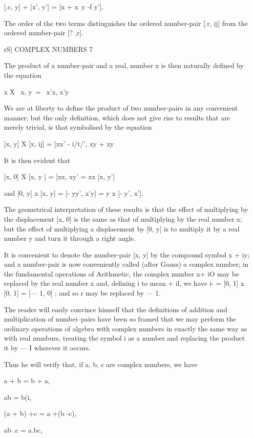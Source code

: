 [.c, y] + [x', y'] = [x + x\ y -f y']. 

The order of the two terms distiuguishes the ordered number-pair [.r, ij] from the ordered 
number-pair [?  ,r]. 



rS] COMPLEX NUMBERS 7 

The product of a number-pair and a real, number x is then naturally 
defined by the equation 

x X \ x, y\ = \ x'x, x'y\ 

We are at liberty to define the product of two number-pairs in any 
convenient manner; but the only definition, which does not give rise to 
results that are merely trivial, is that symbolised by the equation 

[x, y] X [x, ij] = [xx' - i/t/', xy + xy\ 

It is then evident that 

[x, 0] X [x, y ] = [xx, xy'  = xx [x, y'] 

and [0, y] x [x, y] = [- yy', x'y] = y x [- y', x']. 

The geometrical interpretation of these results is that the effect of 
multiplying by the displacement [x, 0] is the same as that of multiplying by 
the real number x; but the effect of multiplying a displacement by [0, y] 
is to multiply it by a real number y and turn it through a right angle. 

It is convenient to denote the number-pair [x, y] by the compound 
symbol x + iy; and a number-pair is now conveniently called (after Gauss) 
a complex number; in the fundamental operations of Arithmetic, the complex 
number x+ iO may be replaced by the real number x and, defining i to mean 
+ il, we have i- = [0, 1] x [0, 1] = [— 1, 0] ; and so r may be replaced by — 1. 

The reader will easily convince himself that the definitions of addition 
and multiplication of numbei--pairs have been so framed that we may perform 
the ordinary operations of algebra with complex numbers in exactly the same 
way as with real numburs, treating the symbol i as a number and replacing 
the product it by — I wherever it occurs. 

Thus he will verify that, if a, b, c are complex numbers, we have 

a + b = b + a, 

ab = b(i, 

(a + b) +c = a +(b -\-c), 

ab .c = a.bc, 

